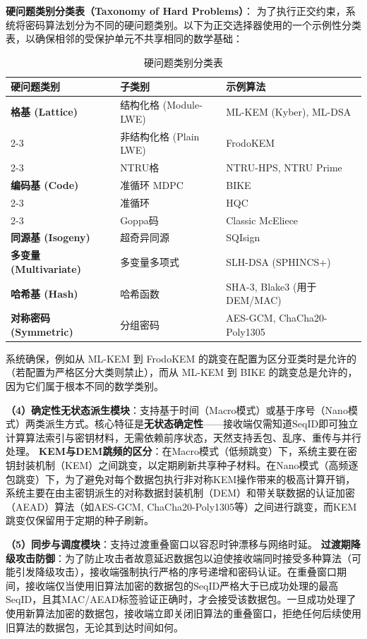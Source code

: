 ﻿\documentclass[12pt,a4paper]{article}
\begin{document}
\textbf{硬问题类别分类表（Taxonomy of Hard Problems）}：
为了执行正交约束，系统将密码算法划分为不同的硬问题类别。以下为正交选择器使用的一个示例性分类表，以确保相邻的受保护单元不共享相同的数学基础：
\begin{table}[H]
\centering
\begin{tabular}{|l|l|l|}
\hline
\textbf{硬问题类别} & \textbf{子类别} & \textbf{示例算法} \\ \hline
\textbf{格基 (Lattice)} & 结构化格 (Module-LWE) & ML-KEM (Kyber), ML-DSA \\ \cline{2-3} 
 & 非结构化格 (Plain LWE) & FrodoKEM \\ \cline{2-3} 
 & NTRU格 & NTRU-HPS, NTRU Prime \\ \hline
\textbf{编码基 (Code)} & 准循环 MDPC & BIKE \\ \cline{2-3} 
 & 准循环 & HQC \\ \cline{2-3} 
 & Goppa码 & Classic McEliece \\ \hline
\textbf{同源基 (Isogeny)} & 超奇异同源 & SQIsign \\ \hline
\textbf{多变量 (Multivariate)} & 多变量多项式 & SLH-DSA (SPHINCS+) \\ \hline
\textbf{哈希基 (Hash)} & 哈希函数 & SHA-3, Blake3 (用于DEM/MAC) \\ \hline
\textbf{对称密码 (Symmetric)} & 分组密码 & AES-GCM, ChaCha20-Poly1305 \\ \hline
\end{tabular}
\caption{硬问题类别分类表}
\end{table}
系统确保，例如从 ML-KEM 到 FrodoKEM 的跳变在配置为区分亚类时是允许的（若配置为严格区分大类则禁止），而从 ML-KEM 到 BIKE 的跳变总是允许的，因为它们属于根本不同的数学类别。

\textbf{（4）确定性无状态派生模块}：支持基于时间（Macro模式）或基于序号（Nano模式）两类派生方式。核心特征是\textbf{无状态确定性}——接收端仅需知道$\text{SeqID}$即可独立计算算法索引与密钥材料，无需依赖前序状态，天然支持丢包、乱序、重传与并行处理。
\textbf{KEM与DEM跳频的区分}：在Macro模式（低频跳变）下，系统主要在密钥封装机制（KEM）之间跳变，以定期刷新共享种子材料。在Nano模式（高频逐包跳变）下，为了避免对每个数据包执行非对称KEM操作带来的极高计算开销，系统主要在由主密钥派生的对称数据封装机制（DEM）和带关联数据的认证加密（AEAD）算法（如AES-GCM, ChaCha20-Poly1305等）之间进行跳变，而KEM跳变仅保留用于定期的种子刷新。

\textbf{（5）同步与调度模块}：支持过渡重叠窗口以容忍时钟漂移与网络时延。
\textbf{过渡期降级攻击防御}：为了防止攻击者故意延迟数据包以迫使接收端同时接受多种算法（可能引发降级攻击），接收端强制执行严格的序号递增和密码认证。在重叠窗口期间，接收端仅当使用旧算法加密的数据包的$\text{SeqID}$严格大于已成功处理的最高$\text{SeqID}$，且其MAC/AEAD标签验证正确时，才会接受该数据包。一旦成功处理了使用新算法加密的数据包，接收端立即关闭旧算法的重叠窗口，拒绝任何后续使用旧算法的数据包，无论其到达时间如何。
\end{document}
